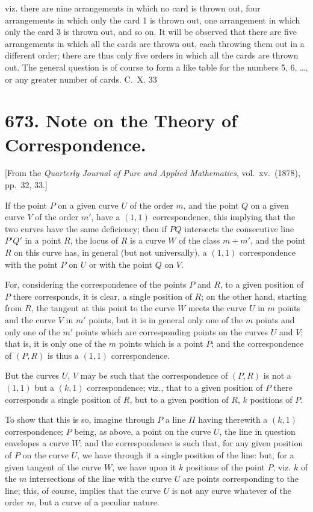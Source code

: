 \documentclass[12pt,a4paper]{article}
\theoremstyle{cayley}
\theoremstyle{definition}
\numberwithin{equation}{section}
\begin{document}
viz. there are nine arrangements in which no card is thrown out, four arrangements in which only the card 1 is thrown out, one arrangement in which only the card 3 is thrown out, and so on. It will be observed that there are five arrangements in which all the cards are thrown out, each throwing them out in a different order; there are thus only five orders in which all the cards are thrown out. The general question is of course to form a like table for the numbers 5, 6, \dots{}, or any greater number of cards.
\hfill C.~X. 33

\newpage

\section*{673. Note on the Theory of Correspondence.}

[From the \textit{Quarterly Journal of Pure and Applied Mathematics}, vol.\ xv.\ (1878), pp.\ 32, 33.]

If the point $P$ on a given curve $U$ of the order $m$, and the point $Q$ on a given curve $V$ of the order $m'$, have a $(1,1)$ correspondence, this implying that the two curves have the same deficiency; then if $PQ$ intersects the consecutive line $P'Q'$ in a point $R$, the locus of $R$ is a curve $W$ of the class $m + m'$, and the point $R$ on this curve has, in general (but not universally), a $(1,1)$ correspondence with the point $P$ on $U$ or with the point $Q$ on $V$.

For, considering the correspondence of the points $P$ and $R$, to a given position of $P$ there corresponds, it is clear, a single position of $R$; on the other hand, starting from $R$, the tangent at this point to the curve $W$ meets the curve $U$ in $m$ points and the curve $V$ in $m'$ points, but it is in general only one of the $m$ points and only one of the $m'$ points which are corresponding points on the curves $U$ and $V$; that is, it is only one of the $m$ points which is a point $P$; and the correspondence of $(P, R)$ is thus a $(1,1)$ correspondence.

But the curves $U$, $V$ may be such that the correspondence of $(P, R)$ is not a $(1,1)$ but a $(k,1)$ correspondence; viz., that to a given position of $P$ there corresponds a single position of $R$, but to a given position of $R$, $k$ positions of $P$.

To show that this is so, imagine through $P$ a line $\Pi$ having therewith a $(k,1)$ correspondence; $P$ being, as above, a point on the curve $U$, the line in question envelopes a curve $W$; and the correspondence is such that, for any given position of $P$ on the curve $U$, we have through it a single position of the line: but, for a given tangent of the curve $W$, we have upon it $k$ positions of the point $P$, viz. $k$ of the $m$ intersections of the line with the curve $U$ are points corresponding to the line; this, of course, implies that the curve $U$ is not any curve whatever of the order $m$, but a curve of a peculiar nature.
\end{document}
